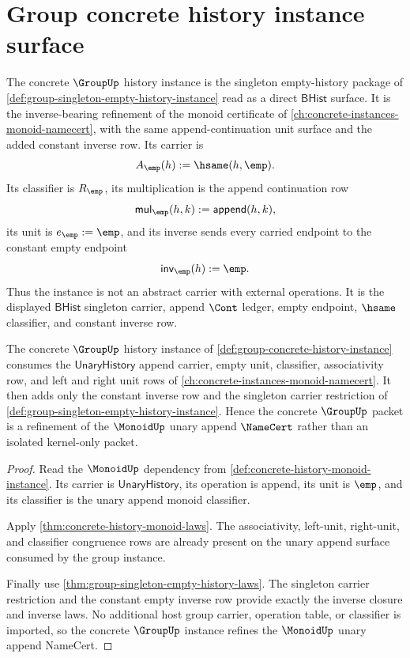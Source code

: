 \section{Group concrete history instance surface}
\label{sec:group-concrete-history-instance-unlock}

\begin{definition}
\label{def:group-concrete-history-instance}
The concrete $\GroupUp$ history instance is the singleton empty-history package
of \autoref{def:group-singleton-empty-history-instance} read as a direct
$\mathsf{BHist}$ surface. It is the inverse-bearing refinement of the monoid
certificate of \autoref{ch:concrete-instances-monoid-namecert}, with the same
append-continuation unit surface and the added constant inverse row. Its carrier is
$$
A_{\emp}(h) := \hsame(h,\emp).
$$
Its classifier is $R_{\emp}$, its multiplication is the append continuation
row
$$
\mathsf{mul}_{\emp}(h,k):=\mathsf{append}(h,k),
$$
its unit is $e_{\emp}:=\emp$, and its inverse sends every carried endpoint to
the constant empty endpoint
$$
\mathsf{inv}_{\emp}(h):=\emp.
$$
Thus the instance is not an abstract carrier with external operations. It is
the displayed $\mathsf{BHist}$ singleton carrier, append $\Cont$ ledger,
empty endpoint, $\hsame$ classifier, and constant inverse row.
\end{definition}

\begin{theorem}
\label{thm:group-concrete-monoid-dependency}
The concrete $\GroupUp$ history instance of \autoref{def:group-concrete-history-instance} consumes the $\mathsf{UnaryHistory}$ append carrier, empty unit, classifier, associativity row, and left and right unit rows of \autoref{ch:concrete-instances-monoid-namecert}. It then adds only the constant inverse row and the singleton carrier restriction of \autoref{def:group-singleton-empty-history-instance}. Hence the concrete $\GroupUp$ packet is a refinement of the $\MonoidUp$ unary append $\NameCert$ rather than an isolated kernel-only packet.
\end{theorem}
\begin{proof}
Read the $\MonoidUp$ dependency from \autoref{def:concrete-history-monoid-instance}. Its carrier is $\mathsf{UnaryHistory}$, its operation is append, its unit is $\emp$, and its classifier is the unary append monoid classifier.

Apply \autoref{thm:concrete-history-monoid-laws}. The associativity, left-unit, right-unit, and classifier congruence rows are already present on the unary append surface consumed by the group instance.

Finally use \autoref{thm:group-singleton-empty-history-laws}. The singleton carrier restriction and the constant empty inverse row provide exactly the inverse closure and inverse laws. No additional host group carrier, operation table, or classifier is imported, so the concrete $\GroupUp$ instance refines the $\MonoidUp$ unary append NameCert.
\end{proof}

